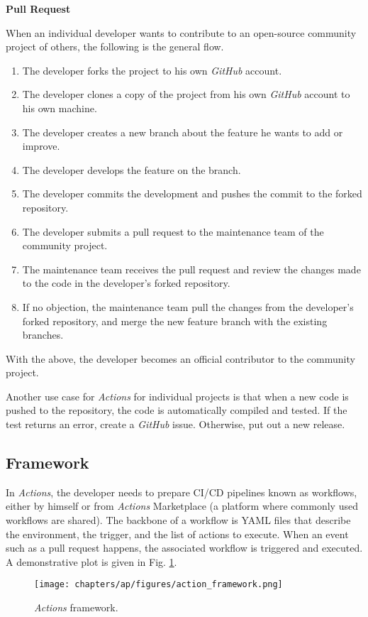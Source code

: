 \begin{mdframed}
	\centerline{\textbf{Pull Request}}
	
	When an individual developer wants to contribute to an open-source community project of others, the following is the general flow.
	\begin{enumerate}
		\item The developer forks the project to his own \textit{GitHub} account.
		\item The developer clones a copy of the project from his own \textit{GitHub} account to his own machine.
		\item The developer creates a new branch about the feature he wants to add or improve.
		\item The developer develops the feature on the branch.
		\item The developer commits the development and pushes the commit to the forked repository.
		\item The developer submits a pull request to the maintenance team of the community project.
		\item The maintenance team receives the pull request and review the changes made to the code in the developer's forked repository.
		\item If no objection, the maintenance team pull the changes from the developer's forked repository, and merge the new feature branch with the existing branches.
	\end{enumerate}
	With the above, the developer becomes an official contributor to the community project.
\end{mdframed}

Another use case for \textit{Actions} for individual projects is that when a new code is pushed to the repository, the code is automatically compiled and tested. If the test returns an error, create a \textit{GitHub} issue. Otherwise, put out a new release.

\subsection{Framework}

In \textit{Actions}, the developer needs to prepare CI/CD pipelines known as workflows, either by himself or from \textit{Actions} Marketplace (a platform where commonly used workflows are shared). The backbone of a workflow is YAML files that describe the environment, the trigger, and the list of actions to execute. When an event such as a pull request happens, the associated workflow is triggered and executed. A demonstrative plot is given in Fig. \ref{ch:cicd:fig:actionframework}.
\begin{figure}[htbp]
	\centering
	\texttt{[image: chapters/ap/figures/action\_framework.png]}
	\caption{\textit{Actions} framework.} \label{ch:cicd:fig:actionframework}
\end{figure}

